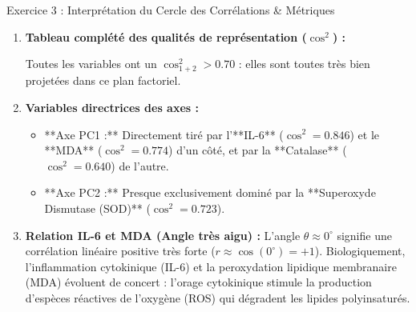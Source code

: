 \documentclass[11pt,a4paper]{article}
\begin{document}
\begin{solutionbox}{Exercice 3 : Interprétation du Cercle des Corrélations \& Métriques}
\begin{enumerate}[label=\textbf{\alph*.}]
  \item \textbf{Tableau complété des qualités de représentation ($\cos^2$) :}
  \begin{center}
  \end{center}
  Toutes les variables ont un $\cos^2_{1+2} > 0.70$ : elles sont toutes très bien projetées dans ce plan factoriel.

  \item \textbf{Variables directrices des axes :}
  \begin{itemize}
    \item **Axe PC1 :** Directement tiré par l'**IL-6** ($\cos^2 = 0.846$) et le **MDA** ($\cos^2 = 0.774$) d'un côté, et par la **Catalase** ($\cos^2 = 0.640$) de l'autre.
    \item **Axe PC2 :** Presque exclusivement dominé par la **Superoxyde Dismutase (SOD)** ($\cos^2 = 0.723$).
  \end{itemize}

  \item \textbf{Relation IL-6 et MDA (Angle très aigu) :}
  L'angle $\theta \approx 0^\circ$ signifie une corrélation linéaire positive très forte ($r \approx \cos(0^\circ) = +1$). Biologiquement, l'inflammation cytokinique (IL-6) et la peroxydation lipidique membranaire (MDA) évoluent de concert : l'orage cytokinique stimule la production d'espèces réactives de l'oxygène (ROS) qui dégradent les lipides polyinsaturés.


\end{enumerate}
\end{solutionbox}
\end{document}
